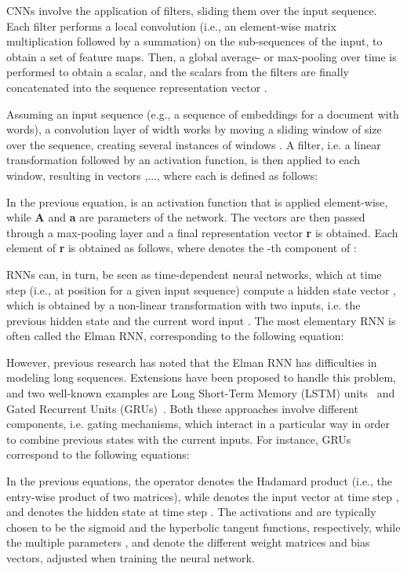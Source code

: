 CNNs involve the application of  filters, sliding them over the input sequence. Each filter performs a local convolution (i.e., an element-wise matrix multiplication followed by a summation) on the sub-sequences of the input, to obtain a set of feature maps. Then, a global average- or max-pooling over time is performed to obtain a scalar, and the scalars from the  filters are finally concatenated into the sequence representation vector .

Assuming an input sequence  (e.g., a sequence of embeddings for a document with  words), a convolution layer of width  works by moving a sliding window of size  over the sequence, creating several instances of windows . A filter, i.e. a linear transformation followed by an activation function, is then applied to each window, resulting in  vectors ,...,  where each is defined as follows:

In the previous equation,  is an activation function that is applied element-wise, while \textbf{A} and \textbf{a} are parameters of the network. The  vectors are then passed through a max-pooling layer and a final representation vector \textbf{r} is obtained. Each element  of \textbf{r} is obtained as follows, where  denotes the -th component of : 


RNNs can, in turn, be seen as time-dependent neural networks, which at time step  (i.e., at position  for a given input sequence) compute a hidden state vector , which is obtained by a non-linear transformation with two inputs, i.e. the previous hidden state  and the current word input . The most elementary RNN is often called the Elman RNN, corresponding to the following equation:


However, previous research has noted that the Elman RNN has difficulties in modeling long sequences. Extensions have been proposed to handle this problem, and two well-known examples are Long Short-Term Memory (LSTM) units~\citep{Hochreiter:1997:LSM:1246443.1246450} and Gated Recurrent Units (GRUs)~\cite{chung2014empirical}. Both these approaches involve different components, i.e. gating mechanisms, which interact in a particular way in order to combine previous states with the current inputs. For instance, GRUs correspond to the following equations:






In the previous equations, the operator  denotes the Hadamard product (i.e., the entry-wise product of two matrices), while  denotes the input vector at time step , and  denotes the hidden state at time step . The activations  and  are typically chosen to be the sigmoid and the hyperbolic tangent functions, respectively, while the multiple parameters ,  and  denote the different weight matrices and bias vectors, adjusted when training the neural network. 

